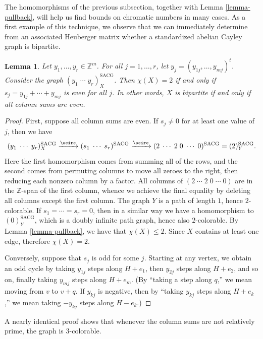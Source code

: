 \documentclass{article}
\newtheorem{Lem}[Thm]{Lemma}
\theoremstyle{definition}
\theoremstyle{remark}
\begin{document}
The homomorphisms of the previous subsection, together with Lemma \ref{lemma-pullback}, will help us find bounds on chromatic numbers in many cases.  As a first example of this technique, we observe that we can immediately determine from an associated Heuberger matrix whether a standardized abelian Cayley graph is bipartite.

\begin{Lem}\label{lemma-bipartite}
Let $y_1,\dots,y_r\in \mathbb{Z}^m$.  For all $j=1,\dots,r$, let $y_j=(y_{1j},\dots,y_{mj})^t$.  Consider the graph $(y_1\;\cdots\;y_r)^{\text{SACG}}_X$.  Then $\chi(X)=2$ if and only if $s_j=y_{1j}+\cdots+y_{mj}$ is even for all $j$.  In other words, $X$ is bipartite if and only if all column sums are even.
\end{Lem}\begin{proof}
First, suppose all column sums are even.  If $s_j\neq 0$ for at least one value of $j$, then we have $$(y_1\;\cdots\;y_r)^{\text{SACG}}_X\xrightarrow{\ocirc}(s_1\;\cdots\;s_r)^{\text{SACG}}\xrightarrow{\ocirc}(2\;\cdots\;2\;0\;\cdots\;0)^{\text{SACG}}=(2)^{\text{SACG}}_Y.$$  
Here the first homomorphism comes from summing all of the rows, and the second comes from permuting columns to move all zeroes to the right, then reducing each nonzero column by a factor.  All columns of $(2\;\cdots\;2\;0\;\cdots\;0)$ are in the $\mathbb{Z}$-span of the first column, whence we achieve the final equality by deleting all columns except the first column.  The graph $Y$ is a path of length $1$, hence $2$-colorable.  If $s_1=\cdots=s_r=0$, then in a similar way we have a homomorphism to $(0)^{\text{SACG}}_Y$, which is a doubly infinite path graph, hence also $2$-colorable.  By Lemma \ref{lemma-pullback}, we have that $\chi(X)\leq 2$.  Since $X$ contains at least one edge, therefore $\chi(X)=2$.

Conversely, suppose that $s_j$ is odd for some $j$.  Starting at any vertex, we obtain an odd cycle by taking $y_{1j}$ steps along $H+e_1$, then $y_{2j}$ steps along $H+e_2$, and so on, finally taking $y_{mj}$ steps along $H+e_m$.  (By ``taking a step along $q$,'' we mean moving from $v$ to $v+q$.  If $y_{kj}$ is negative, then by ``taking $y_{kj}$ steps along $H+e_k$,'' we mean taking $-y_{kj}$ steps along $H-e_k$.)
\end{proof}

A nearly identical proof shows that whenever the column sums are not relatively prime, the graph is $3$-colorable.
\end{document}
